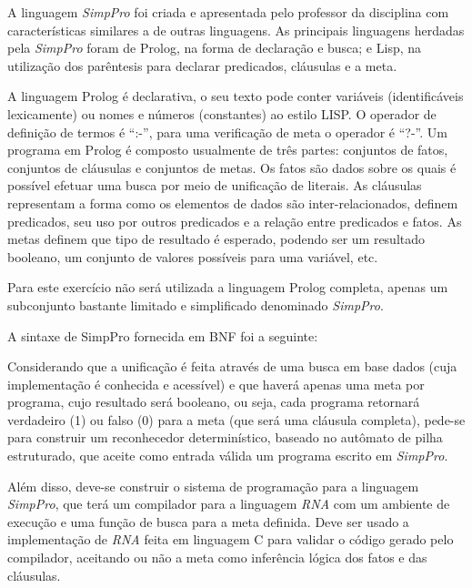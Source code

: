 
A linguagem \emph{SimpPro} foi criada e apresentada pelo professor da disciplina com características similares a de outras linguagens. As principais linguagens herdadas pela \emph{SimpPro} foram de Prolog, na forma de declaração e busca; e Lisp, na utilização dos parêntesis para declarar predicados, cláusulas e a meta.

A linguagem Prolog é declarativa, o seu texto pode conter variáveis (identificáveis lexicamente) ou nomes e números (constantes) ao estilo LISP. O operador de definição de termos é “:-”, para uma verificação de meta o operador é “?-”. Um programa em Prolog é composto usualmente de três partes: conjuntos de fatos, conjuntos de cláusulas e conjuntos de metas. Os fatos são dados sobre os quais é possível efetuar uma busca por meio de unificação de literais. As cláusulas representam a forma como os elementos de dados são inter-relacionados, definem predicados, seu uso por outros predicados e a relação entre predicados e fatos. As metas definem que tipo de resultado é esperado, podendo ser um resultado booleano, um conjunto de valores possíveis para uma variável, etc. 

Para este exercício não será utilizada a linguagem Prolog completa, apenas um subconjunto bastante limitado e simplificado denominado \emph{SimpPro}. 

A sintaxe de SimpPro fornecida em BNF foi a seguinte: 



Considerando que a unificação é feita através de uma busca em base dados (cuja implementação é conhecida e acessível) e que haverá apenas uma meta por programa, cujo resultado será booleano, ou seja, cada programa retornará verdadeiro (1) ou falso (0) para a meta (que será uma cláusula completa), pede-se para construir um reconhecedor determinístico, baseado no autômato de pilha estruturado, que aceite como entrada válida um programa escrito em \emph{SimpPro}.

Além disso, deve-se construir o sistema de programação para a linguagem \emph{SimpPro}, que terá um compilador para a linguagem \emph{RNA} com um ambiente de execução e uma função de busca para a meta definida. Deve ser usado a implementação de \emph{RNA} feita em linguagem C para validar o código gerado pelo compilador, aceitando ou não a meta como inferência lógica dos fatos e das cláusulas. 
